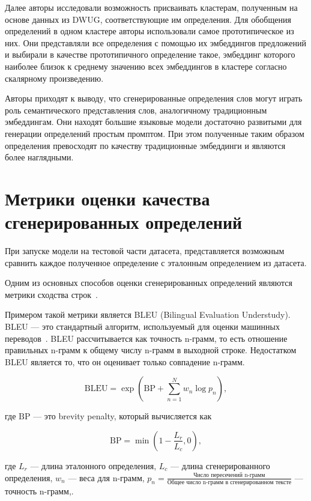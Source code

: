 \documentclass[LI,VKR]{HSEUniversity}
\begin{document}
Далее авторы исследовали возможность присваивать кластерам, полученным на основе данных из DWUG,
соответствующие им определения.
Для обобщения определений в одном кластере авторы использовали самое прототипическое из них.
Они представляли все определения с помощью их эмбеддингов предложений и выбирали в качестве
прототипичного определение такое, эмбеддинг которого наиболее близок к среднему значению всех
эмбеддингов в кластере согласно скалярному произведению.

Авторы приходят к выводу, что сгенерированные определения слов могут играть роль
семантического представления слов, аналогичному традиционным эмбеддингам.
Они находят большие языковые модели достаточно развитыми для генерации определений
простым промптом.
При этом полученные таким образом определения превосходят по качеству
традиционные эмбеддинги и являются более наглядными.

\section{Метрики оценки качества сгенерированных определений}

При запуске модели на тестовой части датасета,
представляется возможным сравнить каждое полученное определение с эталонным определением из датасета.

Одним из основных способов оценки сгенерированных определений являются метрики
сходства строк~\cite{DefinitionModelingReviewAndDatasetAnalysis}.

Примером такой метрики является BLEU (Bilingual Evaluation Understudy).
BLEU — это стандартный алгоритм, используемый для оценки машинных переводов~\cite{BLUE}.
BLEU рассчитывается как точность n-грамм, то есть отношение правильных n-грамм к общему числу n-грамм в выходной строке.
Недостатком BLEU является то, что он оценивает только совпадение n-грамм.

\begin{equation}
\text{BLEU} = \exp \left( \text{BP} + \sum_{n=1}^{N} w_n \log p_n \right),
\end{equation}

где \(\text{BP}\) — это brevity penalty, который вычисляется как

\begin{equation}
\text{BP} = \min\left(1 - \frac{L_r}{L_c}, 0 \right),
\end{equation}

где \(L_r\) — длина эталонного определения,
\(L_c\) — длина сгенерированного определения,
\(w_n\) — веса для n-грамм,
\(p_n = \frac{\text{Число пересечений n-грамм}}{\text{Общее число n-грамм в сгенерированном тексте}}\) — точность n-грамм,.
\end{document}
